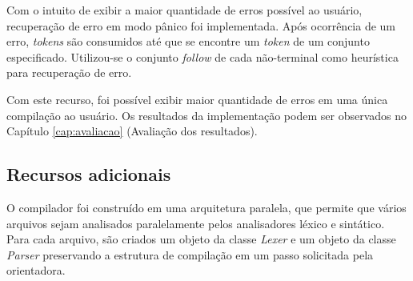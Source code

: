 Com o intuito de exibir a maior quantidade de erros possível ao usuário, recuperação de erro em modo pânico foi implementada. Após ocorrência de um erro, \textit{tokens} são consumidos até que se encontre um \textit{token} de um conjunto especificado. Utilizou-se o conjunto \textit{follow} de cada não-terminal como heurística para recuperação de erro.

Com este recurso, foi possível exibir maior quantidade de erros em uma única compilação ao usuário. Os resultados da implementação podem ser observados no Capítulo \ref{cap:avaliacao} (Avaliação dos resultados).

\subsection{Recursos adicionais}

O compilador foi construído em uma arquitetura paralela, que permite que vários arquivos sejam analisados paralelamente pelos analisadores léxico e sintático. Para cada arquivo, são criados um objeto da classe \textit{Lexer} e um objeto da classe \textit{Parser} preservando a estrutura de compilação em um passo solicitada pela orientadora.